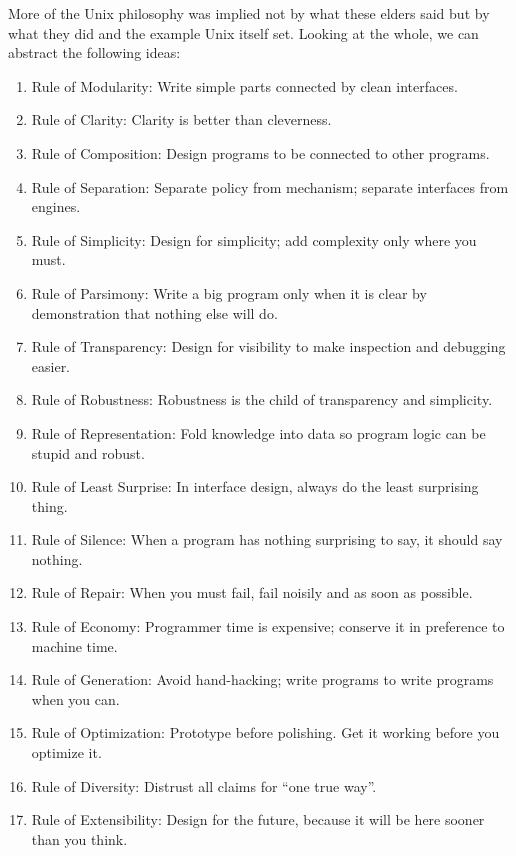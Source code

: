 \documentclass[10pt,twoside,openright]{memoir}
\begin{document}
More of the Unix philosophy was implied not by what these elders said but by what they did and the example Unix itself set. Looking at the whole, we can abstract the following ideas:

\begin{enumerate}

\item Rule of Modularity: Write simple parts connected by clean interfaces.

\item Rule of Clarity: Clarity is better than cleverness.

\item Rule of Composition: Design programs to be connected to other programs.

\item Rule of Separation: Separate policy from mechanism; separate interfaces from engines.

\item Rule of Simplicity: Design for simplicity; add complexity only where you must.

\item Rule of Parsimony: Write a big program only when it is clear by demonstration that nothing else will do.

\item Rule of Transparency: Design for visibility to make inspection and debugging easier.

\item Rule of Robustness: Robustness is the child of transparency and simplicity.

\item Rule of Representation: Fold knowledge into data so program logic can be stupid and robust.

\item Rule of Least Surprise: In interface design, always do the least surprising thing.

\item Rule of Silence: When a program has nothing surprising to say, it should say nothing.

\item Rule of Repair: When you must fail, fail noisily and as soon as possible.

\item Rule of Economy: Programmer time is expensive; conserve it in preference to machine time.

\item Rule of Generation: Avoid hand-hacking; write programs to write programs when you can.

\item Rule of Optimization: Prototype before polishing. Get it working before you optimize it.

\item Rule of Diversity: Distrust all claims for ``one true way''.

\item Rule of Extensibility: Design for the future, because it will be here sooner than you think.

\end{enumerate}
\end{document}
